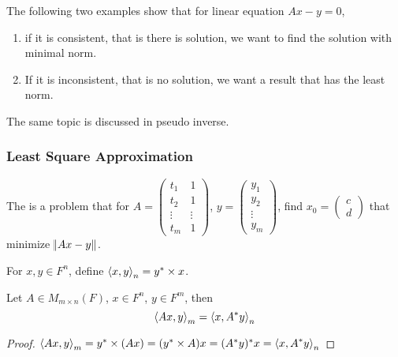 The following two examples show that for linear equation $Ax - y = 0$, 
\begin{enumerate}
    \item if it is consistent, that is there is solution, we want to find the solution with minimal norm.
    \item If it is inconsistent, that is no solution, we want a result that has the least norm.
\end{enumerate}

The same topic is discussed in pseudo inverse.


\subsubsection{Least Square Approximation}

\begin{definition}
    The  is a problem that for $A = \begin{pmatrix}
        t_1 & 1 \\
        t_2 & 1 \\
        \vdots & \vdots \\
        t_m & 1
    \end{pmatrix}$,  $y = \begin{pmatrix}
        y_1\\
        y_2\\
        \vdots\\
        y_m
    \end{pmatrix}$, find $x_0 = \begin{pmatrix}
        c \\
        d
    \end{pmatrix}$ that minimize $\norm{Ax-y}$.
\end{definition}

\begin{definition}
    For $x,y \in F^n$, define $\left\langle \displaystyle x, y \right\rangle_n = y^* \times x$.
\end{definition}


\begin{theorem}
    Let $A \in M_{m \times n} (F)$, $x \in F^n$, $y\in F^m$, then
    \begin{equation}
        \left\langle \displaystyle Ax, y \right\rangle_m = \left\langle \displaystyle x, A^* y \right\rangle_n
    \end{equation}
\end{theorem}
\begin{proof}
    $\left\langle \displaystyle Ax, y \right\rangle_m = y^* \times (Ax) = (y^* \times A) x = (A^* y)^* x = \left\langle \displaystyle x, A^* y \right\rangle_n$
\end{proof}

